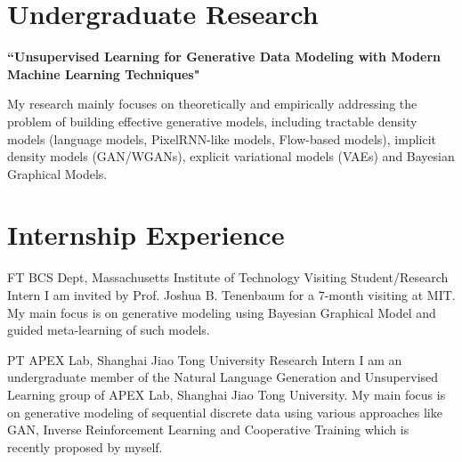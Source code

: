 \documentclass[10pt]{article} %
\begin{document}
\begin{paracol}{2}
\section{Undergraduate Research}

{\raggedright\textbf{``Unsupervised Learning for Generative Data Modeling with Modern Machine Learning Techniques"}\\\medskip}

My research mainly focuses on theoretically and empirically addressing the problem of building effective generative models, including tractable density models (language models, PixelRNN-like models, Flow-based models), implicit density models (GAN/WGANs), explicit variational models (VAEs) and Bayesian Graphical Models.

\medskip %


\section{Internship Experience}





{FT} %
{BCS Dept, Massachusetts Institute of Technology} %
{Visiting Student/Research Intern} %
{I am invited by Prof. Joshua B. Tenenbaum for a 7-month visiting at MIT. My main focus is on generative modeling using Bayesian Graphical Model and guided meta-learning of such models.} %


{PT} %
{APEX Lab, Shanghai Jiao Tong University} %
{Research Intern} %
{I am an undergraduate member of the Natural Language Generation and Unsupervised Learning group of APEX Lab, Shanghai Jiao Tong University. My main focus is on generative modeling of sequential discrete data using various approaches like GAN, Inverse Reinforcement Learning and Cooperative Training which is recently proposed by myself.}  %


\end{paracol}
\end{document}
